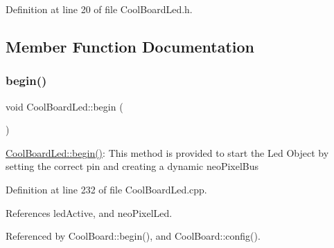 Definition at line 20 of file Cool\+Board\+Led.\+h.



\subsection{Member Function Documentation}
\mbox{\label{classCoolBoardLed_ae3cbde8affcc6f011cbd698c8ef911f6}} 
\subsubsection{\texorpdfstring{begin()}{begin()}}
{\footnotesize\ttfamily void Cool\+Board\+Led\+::begin (\begin{DoxyParamCaption}{ }\end{DoxyParamCaption})}

\hyperlink{classCoolBoardLed_ae3cbde8affcc6f011cbd698c8ef911f6}{Cool\+Board\+Led\+::begin()}\+: This method is provided to start the Led Object by setting the correct pin and creating a dynamic neo\+Pixel\+Bus 

Definition at line 232 of file Cool\+Board\+Led.\+cpp.



References led\+Active, and neo\+Pixel\+Led.



Referenced by Cool\+Board\+::begin(), and Cool\+Board\+::config().


